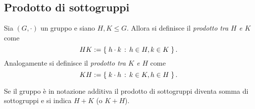 \subsection{Prodotto di sottogruppi}

\begin{definition}
    Sia $(G, \cdot)$ un gruppo e siano $H,K \leq G$. Allora si definisce il \emph{prodotto tra $H$ e $K$} come \begin{equation}
        HK := \left\{\;h\cdot k \,:\, h \in H, k \in K\;\right\}.
    \end{equation} Analogamente si definisce il \emph{prodotto tra $K$ e $H$} come \begin{equation}
        KH := \left\{\;k \cdot h \,:\, k \in K, h \in H\;\right\}.
    \end{equation}
\end{definition}

\begin{remark}
    Se il gruppo è in notazione additiva il prodotto di sottogruppi diventa somma di sottogruppi e si indica $H + K$ (o $K + H$).
\end{remark}

